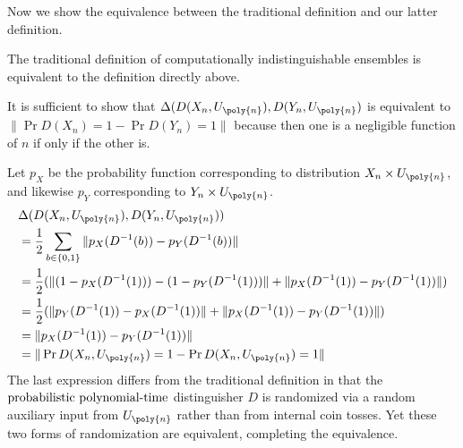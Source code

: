Now we show the equivalence between the traditional definition and our latter definition.
\begin{theorem}
    The traditional definition of computationally indistinguishable ensembles is equivalent to the definition directly above.

    \proof
    It is sufficient to show that $\Delta(D(X_n, U_{\poly{n}}),D(Y_n, U_{\poly{n}})$ is equivalent to $\| \Pr{D(X_n)=1} - \Pr{D(Y_n)=1} \|$ because then one is a negligible function of $n$ if only if the other is.

    Let $p_X$ be the probability function corresponding to distribution $X_n\times U_{\poly{n}}$, and likewise $p_Y$ corresponding to $Y_n\times U_{\poly{n}}$.
    \begin{align}
        & \Delta(D(X_n, U_{\poly{n}}),D(Y_n, U_{\poly{n}})) \\
        &= \frac{1}{2} \sum_{b\in\{0,1\}} \|p_X(D^{-1}(b)) - p_Y(D^{-1}(b))\| \\
        &= \frac{1}{2} (
            \| (1 - p_X(D^{-1}(1))) - (1 - p_Y(D^{-1}(1))) \| + \| p_X(D^{-1}(1)) - p_Y(D^{-1}(1)) \|
            ) \\
        &= \frac{1}{2} (
            \| p_Y(D^{-1}(1)) - p_X(D^{-1}(1)) \| + \| p_X(D^{-1}(1)) - p_Y(D^{-1}(1)) \|
            ) \\
        &= \| p_X(D^{-1}(1)) - p_Y(D^{-1}(1)) \| \\
        &= \| \Pr{D(X_n, U_{\poly{n}})=1} - \Pr{D(X_n, U_{\poly{n}})=1} \|
    \end{align}
    The last expression differs from the traditional definition in that the $\text{probabilistic polynomial-time}$ distinguisher $D$ is randomized via a random auxiliary input from $U_{\poly{n}}$ rather than from internal coin tosses.
    Yet these two forms of randomization are equivalent, completing the equivalence.
\end{theorem}

